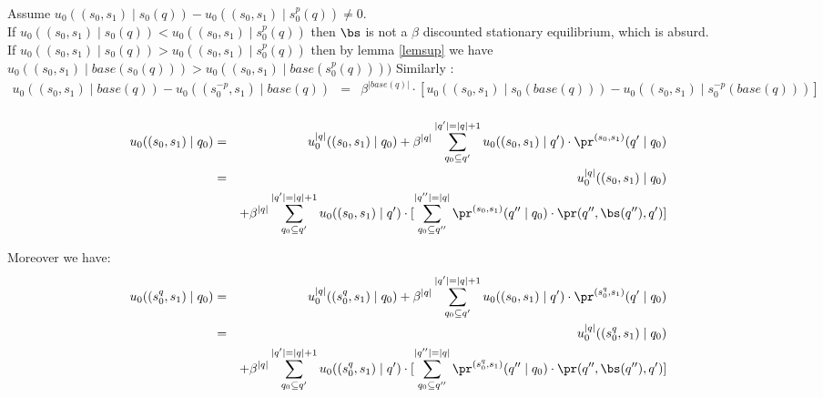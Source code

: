Assume $u_0((s_0,s_1) \mid s_0(q)) - u_0((s_0,s_1) \mid s^p_0(q)) \neq 0$. 
\\ If $u_0((s_0,s_1) \mid s_0(q)) < u_0((s_0,s_1) \mid s^p_0(q)) $ then $\bs$ is not a $\beta$ discounted stationary equilibrium, which is absurd.
\\ If $u_0((s_0,s_1) \mid s_0(q)) > u_0((s_0,s_1) \mid s^p_0(q)) $ then by lemma \ref{lemsup} we have $u_0((s_0,s_1) \mid base(s_0(q))) > u_0((s_0,s_1) \mid base(s^p_0(q)))) $
Similarly : 
\begin{eqnarray*}
	u_0((s_0,s_1) \mid base(q)) -  u_0((s^{-p}_0,s_1) \mid base(q)) 
	& = & \beta^{|base(q)|} \cdot[ u_0((s_0,s_1) \mid s_0(base(q))) - u_0((s_0,s_1) \mid s^{-p}_0(base(q)))] \\ 
\end{eqnarray*}



\begin{eqnarray*}
	u_0((s_0,s_1) \mid q_0)  & = & u_0^{|q|}((s_0,s_1) \mid q_0) + \beta^{|q|} \sum_{q_0 \subseteq q'}^{|q'|=|q|+1} u_0((s_0,s_1) \mid q') \cdot \pr^{(s_0,s_1)}(q' \mid q_0) \\
	& = & u_0^{|q|}((s_0,s_1) \mid q_0) \\
	&& + \beta^{|q|} \sum_{q_0 \subseteq q'}^{|q'|=|q|+1} u_0((s_0,s_1) \mid q') \cdot [\sum_{q_0 \subseteq q''}^{|q''| = |q|} \pr^{(s_0,s_1)}(q'' \mid q_0) \cdot \pr(q'',\bs(q''),q')] \\
\end{eqnarray*}

Moreover we have:
\begin{eqnarray*}
	u_0((s^{q}_0,s_1) \mid q_0)  & = & u_0^{|q|}((s^{q}_0,s_1) \mid q_0) + \beta^{|q|} \sum_{q_0 \subseteq q'}^{|q'|=|q|+1} u_0((s_0,s_1) \mid q') \cdot \pr^{(s^{q}_0,s_1)}(q' \mid q_0) \\
	& = & u_0^{|q|}((s^{q}_0,s_1) \mid q_0) \\
	&& + \beta^{|q|} \sum_{q_0 \subseteq q'}^{|q'|=|q|+1} u_0((s^{q}_0,s_1) \mid q') \cdot [\sum_{q_0 \subseteq q''}^{|q''| = |q|} \pr^{(s^{q}_0,s_1)}(q'' \mid q_0) \cdot \pr(q'',\bs(q''),q')] \\
\end{eqnarray*}

